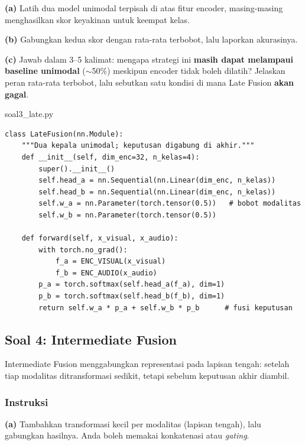 \documentclass[12pt, a4paper]{article}
\begin{document}
\textbf{(a)} Latih dua model unimodal terpisah di atas fitur encoder, masing-masing
menghasilkan skor keyakinan untuk keempat kelas.

\textbf{(b)} Gabungkan kedua skor dengan rata-rata terbobot, lalu laporkan akurasinya.

\textbf{(c)} Jawab dalam 3--5 kalimat: mengapa strategi ini \textbf{masih dapat
melampaui baseline unimodal} ($\sim$50\%) meskipun encoder tidak boleh dilatih?
Jelaskan peran rata-rata terbobot, lalu sebutkan satu kondisi di mana Late Fusion
\textbf{akan gagal}.

\begin{codewindow}{soal3\_late.py}
\begin{lstlisting}[style=pycode]
class LateFusion(nn.Module):
    """Dua kepala unimodal; keputusan digabung di akhir."""
    def __init__(self, dim_enc=32, n_kelas=4):
        super().__init__()
        self.head_a = nn.Sequential(nn.Linear(dim_enc, n_kelas))
        self.head_b = nn.Sequential(nn.Linear(dim_enc, n_kelas))
        self.w_a = nn.Parameter(torch.tensor(0.5))   # bobot modalitas
        self.w_b = nn.Parameter(torch.tensor(0.5))

    def forward(self, x_visual, x_audio):
        with torch.no_grad():
            f_a = ENC_VISUAL(x_visual)
            f_b = ENC_AUDIO(x_audio)
        p_a = torch.softmax(self.head_a(f_a), dim=1)
        p_b = torch.softmax(self.head_b(f_b), dim=1)
        return self.w_a * p_a + self.w_b * p_b      # fusi keputusan
\end{lstlisting}
\end{codewindow}

\clearpage
\subsection{Soal 4: Intermediate Fusion}
\label{sec:soal4}

Intermediate Fusion menggabungkan representasi pada lapisan tengah: setelah tiap modalitas
ditransformasi sedikit, tetapi sebelum keputusan akhir diambil.

\subsubsection{Instruksi}
\label{sec:soal4-instruksi}

\textbf{(a)} Tambahkan transformasi kecil per modalitas (lapisan tengah), lalu gabungkan
hasilnya. Anda boleh memakai konkatenasi atau \emph{gating}.
\end{document}
